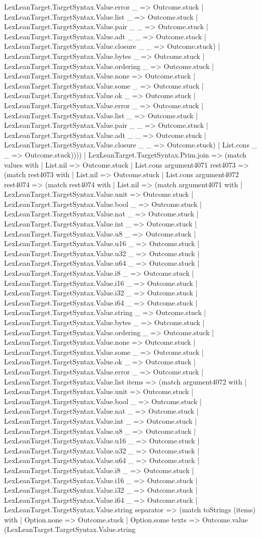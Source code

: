 \documentclass[11pt]{article}
\begin{document}
LexLeanTarget.TargetSyntax.Value.error \_ => Outcome.stuck | LexLeanTarget.TargetSyntax.Value.list \_ => Outcome.stuck | LexLeanTarget.TargetSyntax.Value.pair \_ \_ => Outcome.stuck | LexLeanTarget.TargetSyntax.Value.adt \_ \_ => Outcome.stuck | LexLeanTarget.TargetSyntax.Value.closure \_ \_ => Outcome.stuck) | LexLeanTarget.TargetSyntax.Value.bytes \_ => Outcome.stuck | LexLeanTarget.TargetSyntax.Value.ordering \_ => Outcome.stuck | LexLeanTarget.TargetSyntax.Value.none => Outcome.stuck | LexLeanTarget.TargetSyntax.Value.some \_ => Outcome.stuck | LexLeanTarget.TargetSyntax.Value.ok \_ => Outcome.stuck | LexLeanTarget.TargetSyntax.Value.error \_ => Outcome.stuck | LexLeanTarget.TargetSyntax.Value.list \_ => Outcome.stuck | LexLeanTarget.TargetSyntax.Value.pair \_ \_ => Outcome.stuck | LexLeanTarget.TargetSyntax.Value.adt \_ \_ => Outcome.stuck | LexLeanTarget.TargetSyntax.Value.closure \_ \_ => Outcome.stuck) | List.cons \_ \_ => Outcome.stuck)))) | LexLeanTarget.TargetSyntax.Prim.join => (match values with | List.nil => Outcome.stuck | List.cons argument4071 rest4073 => (match rest4073 with | List.nil => Outcome.stuck | List.cons argument4072 rest4074 => (match rest4074 with | List.nil => (match argument4071 with | LexLeanTarget.TargetSyntax.Value.unit => Outcome.stuck | LexLeanTarget.TargetSyntax.Value.bool \_ => Outcome.stuck | LexLeanTarget.TargetSyntax.Value.nat \_ => Outcome.stuck | LexLeanTarget.TargetSyntax.Value.int \_ => Outcome.stuck | LexLeanTarget.TargetSyntax.Value.u8 \_ => Outcome.stuck | LexLeanTarget.TargetSyntax.Value.u16 \_ => Outcome.stuck | LexLeanTarget.TargetSyntax.Value.u32 \_ => Outcome.stuck | LexLeanTarget.TargetSyntax.Value.u64 \_ => Outcome.stuck | LexLeanTarget.TargetSyntax.Value.i8 \_ => Outcome.stuck | LexLeanTarget.TargetSyntax.Value.i16 \_ => Outcome.stuck | LexLeanTarget.TargetSyntax.Value.i32 \_ => Outcome.stuck | LexLeanTarget.TargetSyntax.Value.i64 \_ => Outcome.stuck | LexLeanTarget.TargetSyntax.Value.string \_ => Outcome.stuck | LexLeanTarget.TargetSyntax.Value.bytes \_ => Outcome.stuck | LexLeanTarget.TargetSyntax.Value.ordering \_ => Outcome.stuck | LexLeanTarget.TargetSyntax.Value.none => Outcome.stuck | LexLeanTarget.TargetSyntax.Value.some \_ => Outcome.stuck | LexLeanTarget.TargetSyntax.Value.ok \_ => Outcome.stuck | LexLeanTarget.TargetSyntax.Value.error \_ => Outcome.stuck | LexLeanTarget.TargetSyntax.Value.list items => (match argument4072 with | LexLeanTarget.TargetSyntax.Value.unit => Outcome.stuck | LexLeanTarget.TargetSyntax.Value.bool \_ => Outcome.stuck | LexLeanTarget.TargetSyntax.Value.nat \_ => Outcome.stuck | LexLeanTarget.TargetSyntax.Value.int \_ => Outcome.stuck | LexLeanTarget.TargetSyntax.Value.u8 \_ => Outcome.stuck | LexLeanTarget.TargetSyntax.Value.u16 \_ => Outcome.stuck | LexLeanTarget.TargetSyntax.Value.u32 \_ => Outcome.stuck | LexLeanTarget.TargetSyntax.Value.u64 \_ => Outcome.stuck | LexLeanTarget.TargetSyntax.Value.i8 \_ => Outcome.stuck | LexLeanTarget.TargetSyntax.Value.i16 \_ => Outcome.stuck | LexLeanTarget.TargetSyntax.Value.i32 \_ => Outcome.stuck | LexLeanTarget.TargetSyntax.Value.i64 \_ => Outcome.stuck | LexLeanTarget.TargetSyntax.Value.string separator => (match toStrings (items) with | Option.none => Outcome.stuck | Option.some texts => Outcome.value (LexLeanTarget.TargetSyntax.Value.string 
\end{document}
